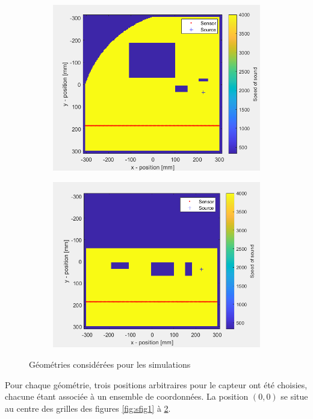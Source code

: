 \documentclass[conference]{IEEEtran}
\begin{document}
\begin{figure}[H]
\begin{subfigure}{.155\textwidth}
    \includegraphics[width=.95\linewidth]{forme5.png}
    \caption{}
    \label{fig:sfig5}
  \end{subfigure}
  \begin{subfigure}{.155\textwidth}
    \centering
    \includegraphics[width=.95\linewidth]{forme6.png}
    \caption{}
    \label{fig:sfig6}
  \end{subfigure}
  \caption{Géométries considérées pour les simulations}
  \label{fig:fig}
\end{figure}
Pour chaque géométrie, trois positions arbitraires pour le capteur ont été choisies,
chacune étant associée à un ensemble de coordonnées. La position $(0,0)$ se situe 
au centre des grilles des figures \ref{fig:sfig1} à \ref{fig:sfig6}. 
\end{document}
